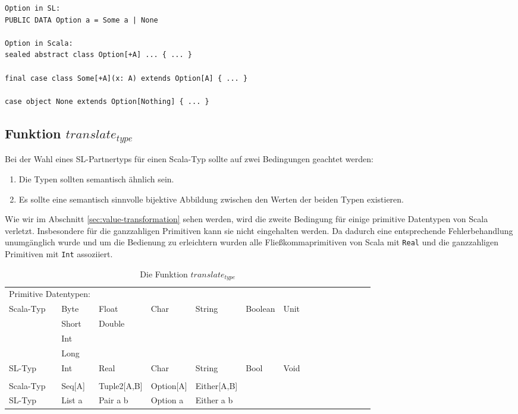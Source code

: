\documentclass[12pt,bibtotoc]{scrreprt}
\begin{document}
\begin{lstlisting}[caption=Option in SL und Scala, label=lst:option-in-sl-scala, float=h]
Option in SL:
PUBLIC DATA Option a = Some a | None

Option in Scala:
sealed abstract class Option[+A] ... { ... }

final case class Some[+A](x: A) extends Option[A] { ... }

case object None extends Option[Nothing] { ... }
\end{lstlisting}

\subsection{Funktion $translate_{type}$}
\label{subsec:translate_type}


Bei der Wahl eines SL-Partnertyps für einen Scala-Typ sollte auf zwei Bedingungen geachtet werden:

\begin{enumerate}
 \item{Die Typen sollten semantisch ähnlich sein.}
 \item{Es sollte eine semantisch sinnvolle bijektive Abbildung zwischen den Werten der beiden Typen existieren. }
\end{enumerate}

Wie wir im Abschnitt \ref{sec:value-transformation} sehen werden, wird die zweite Bedingung für einige primitive Datentypen von Scala verletzt. Insbesondere für die ganzzahligen Primitiven kann sie nicht eingehalten werden. Da dadurch eine entsprechende Fehlerbehandlung unumgänglich wurde und um die Bedienung zu erleichtern wurden alle Fließkommaprimitiven von Scala mit \lstinline!Real! und die ganzzahligen Primitiven mit \lstinline!Int! assoziiert.

\begin{table}[h]
\caption{Die Funktion $translate_{type}$}
\centering
\begin{tabular}{l|llllllllllllll}
\multicolumn{2}{l}{Primitive Datentypen:}\\
Scala-Typ & Byte & Float & Char & String & Boolean & Unit \\
 & Short & Double\\
 & Int\\
 & Long\\
SL-Typ & Int & Real & Char & String & Bool & Void \\
\addlinespace
\multicolumn{2}{l}{Andere:} \\
Scala-Typ & Seq[A] & Tuple2[A,B] & Option[A] & Either[A,B] \\
SL-Typ &  List a & Pair a b & Option a & Either a b \\
\end{tabular}
\label{tab:translate_type}
\end{table}
\end{document}

